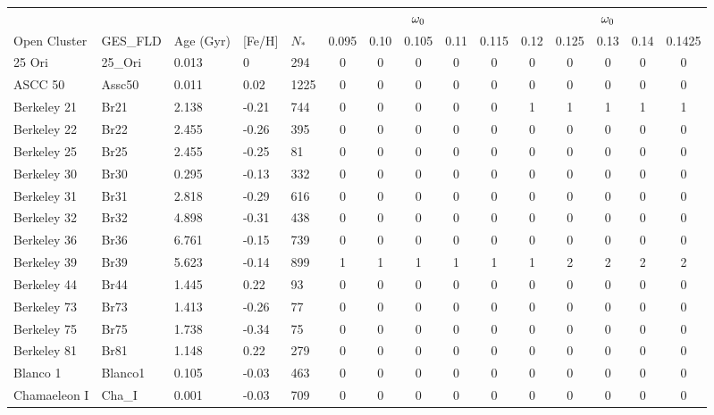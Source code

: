 \documentclass[fleqn,usenatbib]{mnras}
\begin{document}
\begin{table}
	\centering
	\begin{tabular}{|l l l l l || c c c c c | c c c c c|} 
		\hline
             & & & & & & & $\omega_{\mathrm{0}}$ & & & & & $\omega_{\mathrm{0}}$ & & \\
		Open Cluster & GES\_FLD & Age (Gyr) & [Fe/H] & $N_*$ & 0.095 & 0.10 & 0.105 & 0.11 & 0.115 & 0.12 & 0.125 & 0.13 & 0.14 & 0.1425\\
		\hline
            25 Ori & 25\_Ori & 0.013 & 0 & 294 & 0 & 0 & 0 & 0 & 0 & 0 & 0 & 0 & 0 & 0\\
            ASCC 50 & Assc50 & 0.011 & 0.02 & 1225 & 0 & 0 & 0 & 0 & 0 & 0 & 0 & 0 & 0 & 0\\
            \rowcolor{lightgray}
            Berkeley 21 & Br21 & 2.138 & -0.21 & 744 & 0 & 0 & 0 & 0 & 0 & 1 & 1 & 1 & 1 & 1\\
            Berkeley 22 & Br22 & 2.455 & -0.26 & 395 & 0 & 0 & 0 & 0 & 0 & 0 & 0 & 0 & 0 & 0\\
            Berkeley 25 & Br25 & 2.455 & -0.25 & 81 & 0 & 0 & 0 & 0 & 0 & 0 & 0 & 0 & 0 & 0\\
            Berkeley 30 & Br30 & 0.295 & -0.13 & 332 & 0 & 0 & 0 & 0 & 0 & 0 & 0 & 0 & 0 & 0\\
            Berkeley 31 & Br31 & 2.818 & -0.29 & 616 & 0 & 0 & 0 & 0 & 0 & 0 & 0 & 0 & 0 & 0\\
            Berkeley 32 & Br32 & 4.898 & -0.31 & 438 & 0 & 0 & 0 & 0 & 0 & 0 & 0 & 0 & 0 & 0\\
            Berkeley 36 & Br36 & 6.761 & -0.15 & 739 & 0 & 0 & 0 & 0 & 0 & 0 & 0 & 0 & 0 & 0\\
            \rowcolor{lightgray}
            Berkeley 39 & Br39 & 5.623 & -0.14 & 899 & 1 & 1 & 1 & 1 & 1 & 1 & 2 & 2 & 2 & 2\\
            Berkeley 44 & Br44 & 1.445 & 0.22 & 93 & 0 & 0 & 0 & 0 & 0 & 0 & 0 & 0 & 0 & 0\\
            Berkeley 73 & Br73 & 1.413 & -0.26 & 77 & 0 & 0 & 0 & 0 & 0 & 0 & 0 & 0 & 0 & 0\\
            Berkeley 75 & Br75 & 1.738 & -0.34 & 75 & 0 & 0 & 0 & 0 & 0 & 0 & 0 & 0 & 0 & 0\\
            Berkeley 81 & Br81 & 1.148 & 0.22 & 279 & 0 & 0 & 0 & 0 & 0 & 0 & 0 & 0 & 0 & 0\\
            Blanco 1 & Blanco1 & 0.105 & -0.03 & 463 & 0 & 0 & 0 & 0 & 0 & 0 & 0 & 0 & 0 & 0\\
            Chamaeleon I & Cha\_I & 0.001 & -0.03 & 709 & 0 & 0 & 0 & 0 & 0 & 0 & 0 & 0 & 0 & 0\\

\end{tabular}
\end{table}
\end{document}

